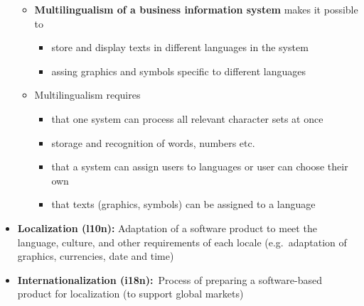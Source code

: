 \documentclass[ieeetran]{article}
\begin{document}
\begin{itemize}
	\begin{itemize}
	\item \textbf{Multilingualism of a business information system} makes it possible to
		\begin{itemize}
		  \item store and display texts in different languages in the system
		\item assing graphics and symbols specific to different languages 
		\end{itemize}
	
\item Multilingualism requires
	\begin{itemize}

\item that one system can process all relevant character sets at once
	\item storage and recognition of words, numbers etc.
	\item that a system can assign users to languages or user can choose their own
	\item that texts (graphics, symbols) can be assigned to a language
	\end{itemize}
	\end{itemize}
\item \textbf{Localization (l10n):} Adaptation of a software product to meet the language, culture, and other requirements of each locale (e.g.\ adaptation of graphics, currencies, date and time)
\item \textbf{Internationalization (i18n):}\ Process of preparing a software-based product for localization (to support global markets)
\end{itemize}
\end{document}
